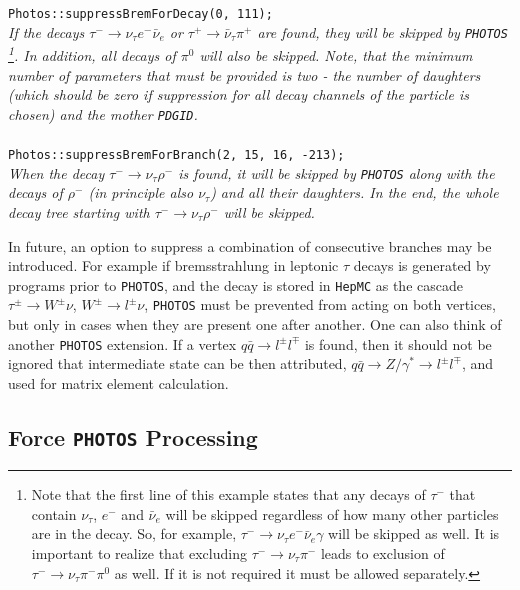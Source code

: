 \documentclass[]{Photos_interface_design}
\begin{document}
\begin{itemize}
{\tt Photos::suppressBremForDecay(0, 111); } \\
\emph{If the decays $\tau^- \rightarrow \nu_\tau e^- \bar \nu_e$ or
      $\tau^+ \rightarrow \bar \nu_\tau \pi^+$ are found, they will be skipped by {\tt PHOTOS}{%
      \footnote{Note that the first line of this example states that any decays of $\tau^-$
      that contain $\nu_\tau$, $e^-$ and $\bar \nu_e$ will be skipped regardless of how many other particles are in the decay.
      So, for example, $\tau^- \rightarrow \nu_\tau e^- \bar \nu_e \gamma$ will be skipped as well. It is important to realize that excluding 
$\tau^-  \rightarrow \nu_\tau \pi^-$ leads to exclusion of
$\tau^- \rightarrow \nu_\tau \pi^-\pi^0$ as well. If it is not required it must be allowed separately.}}.
	  In addition, all decays of $\pi^0$ will also be skipped. Note, that the minimum
	  number of parameters that must be provided is two - the number of daughters
	  (which should be zero if suppression for all decay channels of the particle is chosen) 
	  and the mother {\tt PDGID}.} \\ \\
{\tt Photos::suppressBremForBranch(2, 15, 16, -213); } \\
\emph{When the decay $\tau^- \rightarrow \nu_\tau \rho^-$ is found, it will be skipped by
      {\tt PHOTOS} along with the decays of   $\rho^-$ 
(in principle also $\nu_\tau$) and all
	  their daughters. In the end, the whole decay tree starting with
	  $\tau^- \rightarrow \nu_\tau \rho^-$ will be skipped.}
\end{itemize}

In future, an option to suppress a combination of consecutive branches may be introduced.
For example if bremsstrahlung in leptonic $\tau$ decays is generated by
programs prior to {\tt PHOTOS}, and the decay is stored in {\tt HepMC} as the cascade
$\tau^\pm \to W^\pm \nu$, $W^\pm \to l^\pm \nu$, {\tt PHOTOS} must
be prevented from acting on both vertices, but only in cases when they are present one after another.
One can also think of another {\tt PHOTOS} extension. 
If a vertex $q \bar q \to l^\pm l^\mp$ is found, then it should not be ignored 
that intermediate state can be then attributed, 
$q \bar q \to Z/\gamma^* \to l^\pm l^\mp$,
and used for matrix element calculation.


\subsection{Force {\tt PHOTOS} Processing }
\label{section:force}
\end{document}
